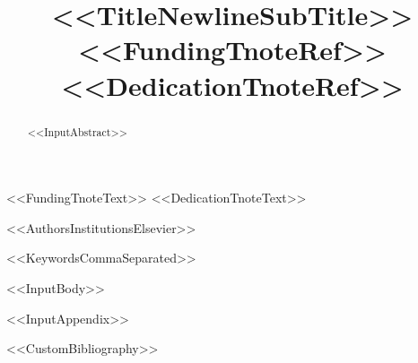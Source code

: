 \documentclass[%
preprint,
12pt,
<<DocumentClassOptions>>]{elsarticle}
\begin{document}
\begin{frontmatter}

\title{<<TitleNewlineSubTitle>><<FundingTnoteRef>><<DedicationTnoteRef>>}
<<FundingTnoteText>>
<<DedicationTnoteText>>

<<AuthorsInstitutionsElsevier>>

\begin{abstract} 
<<InputAbstract>>
\end{abstract}

\begin{keyword}
<<KeywordsCommaSeparated>>
\end{keyword}

\end{frontmatter}

<<InputBody>>

\appendix
<<InputAppendix>>


<<CustomBibliography>>
\end{document}
